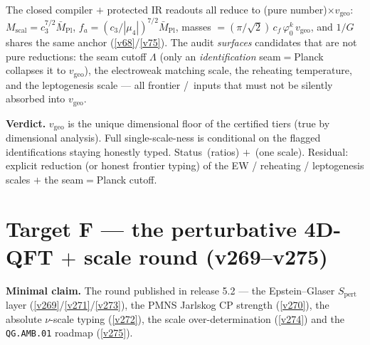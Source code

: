 \documentclass[11pt,a4paper]{article}
\newcommand{\cthree}{c_3}
\newcommand{\vgeo}{v_{\mathrm{geo}}}
\newcommand{\Mpl}{\bar M_{\mathrm{Pl}}}
\begin{document}
\begin{keybox}
The closed compiler $+$ protected IR readouts all reduce to (pure number)$\times\vgeo$:
$M_{\mathrm{scal}}=\cthree^{7/2}\Mpl$, $f_a=(\cthree/|\mu_4|)^{7/2}\Mpl$, masses
$=(\pi/\sqrt2)\,c_f\,\varphi_0^{k}\,\vgeo$, and $1/G$ shares the same anchor (\vref{v68}/\vref{v75}). The audit
\emph{surfaces} candidates that are not pure reductions: the seam cutoff $\Lambda$ (only an
\emph{identification} seam$=$Planck collapses it to $\vgeo$), the electroweak matching scale, the
reheating temperature, and the leptogenesis scale --- all frontier \mC/\mO\ inputs that must not be
silently absorbed into $\vgeo$.
\end{keybox}

\noindent\textbf{Verdict.} $\vgeo$ is the unique dimensional floor of the certified tiers (true by
dimensional analysis). Full single-scale-ness is conditional on the flagged identifications staying
honestly typed. Status \mE\,(ratios) $+$ \mO\,(one scale). Residual: explicit reduction (or honest
frontier typing) of the EW / reheating / leptogenesis scales $+$ the seam$=$Planck cutoff.

\section*{Target F --- the perturbative 4D-QFT $+$ scale round (v269--v275)}\label{sec:F}
\noindent\textbf{Minimal claim.} The round published in release 5.2 --- the Epstein--Glaser
$S_{\mathrm{pert}}$ layer (\vref{v269}/\vref{v271}/\vref{v273}), the PMNS Jarlskog CP strength
(\vref{v270}), the absolute $\nu$-scale typing (\vref{v272}), the scale over-determination
(\vref{v274}) and the \texttt{QG.AMB.01} roadmap (\vref{v275}).
\end{document}
